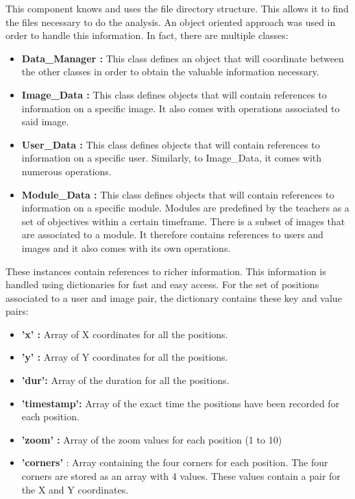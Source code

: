 \documentclass[a4paper,11pt]{report}
\numberwithin{figure}{section} %
\begin{document}
    This component knows and uses the file directory structure.
    This allows it to find the files necessary to do the analysis.
    An object oriented approach was used in order to handle this information.
    In fact, there are multiple classes:

    \begin{itemize}
        \item[\textbullet] \textbf{Data\_Manager :} This class defines an object that will coordinate between the other classes in order to obtain the valuable information necessary.
        \item[\textbullet] \textbf{Image\_Data :} This class defines objects that will contain references to information on a specific image.
        It also comes with operations associated to said image.
        \item[\textbullet] \textbf{User\_Data :} This class defines objects that will contain references to information on a specific user.
        Similarly, to Image\_Data, it comes with numerous operations.
        \item[\textbullet] \textbf{Module\_Data :} This class defines objects that will contain references to information on a specific module.
        Modules are predefined by the teachers as a set of objectives within a certain timeframe.
        There is a subset of images that are associated to a module.
        It therefore contains references to users and images and it also comes with its own operations.
    \end{itemize}

    These instances contain references to richer information.
    This information is handled using dictionaries for fast and easy access.
    For the set of positions associated to a user and image pair, the dictionary contains these key and value pairs:
    \begin{itemize}
        \item[\textbullet] \textbf{'x' :} Array of X coordinates for all the positions.
        \item[\textbullet] \textbf{'y' :} Array of Y coordinates for all the positions.
        \item[\textbullet] \textbf{'dur':} Array of the duration for all the positions.
        \item[\textbullet] \textbf{'timestamp':} Array of the exact time the positions have been recorded for each position.
        \item[\textbullet] \textbf{'zoom' :} Array of the zoom values for each position (1 to 10)
        \item[\textbullet] \textbf{'corners'} : Array containing the four corners for each position.
        The four corners are stored as an array with 4 values.
        These values contain a pair for the X and Y coordinates.
    \end{itemize}
\end{document}
